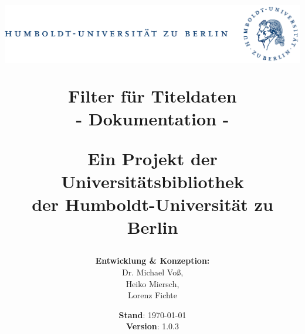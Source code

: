 \documentclass[10pt]{article}
\begin{document}
\title{
\begin{center}\includegraphics*[width=15cm]{hukombi-eps-converted-to.pdf} \end{center}
\vspace{2cm}
Filter für Titeldaten \\
- Dokumentation - \\
\vspace{1.5cm}
\begin{normalsize}
Ein Projekt der Universitätsbibliothek \\
der Humboldt-Universität zu Berlin
\end{normalsize}
\vspace{2cm}
}

\author{\textbf{Entwicklung \& Konzeption:} \\
	Dr. Michael Voß, \\
	Heiko Miersch, \\
	Lorenz Fichte} 
\date{\textbf{Stand}: \today \\
\vspace{1cm}
\textbf{Version}: 1.0.3 \\
\vspace{1cm}
}

\maketitle
\newpage
{}

\begin{spacing}{1.0}
\tableofcontents
\thispagestyle{empty}
\end{spacing}
\newpage


\setcounter{page}{1}
\newpage

\end{document}
